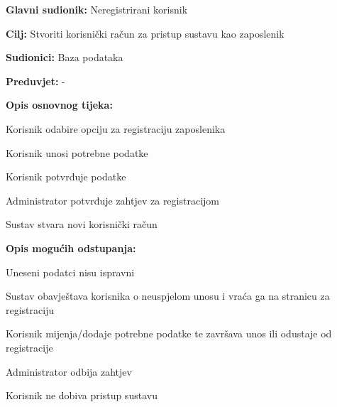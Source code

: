					\noindent {}
					\begin{packed_item}
						
						\item \textbf{Glavni sudionik:} Neregistrirani korisnik
						\item  \textbf{Cilj:} Stvoriti korisnički račun za pristup sustavu kao zaposlenik
						\item  \textbf{Sudionici:} Baza podataka
						\item  \textbf{Preduvjet:} -
						\item  \textbf{Opis osnovnog tijeka:}
						
						\item[] \begin{packed_enum}
							
							\item Korisnik odabire opciju za registraciju zaposlenika
							\item Korisnik unosi potrebne podatke
							\item Korisnik potvrđuje podatke
							\item Administrator potvrđuje zahtjev za registracijom
							\item Sustav stvara novi korisnički račun
						\end{packed_enum}
						
						\item  \textbf{Opis mogućih odstupanja:}
						
						\item[] \begin{packed_item}
							
							\item[3.a] Uneseni podatci nisu ispravni 
							\item[] \begin{packed_enum}
								
								\item Sustav obavještava korisnika o neuspjelom unosu i vraća ga na stranicu za registraciju
								\item Korisnik mijenja/dodaje potrebne podatke te završava unos ili odustaje od registracije
								
							\end{packed_enum}
						
							\item[4.a] Administrator odbija zahtjev
							\item [] \begin{packed_enum}
								
								\item Korisnik ne dobiva pristup sustavu
							
							\end{packed_enum}
						\end{packed_item}
					\end{packed_item}
				
